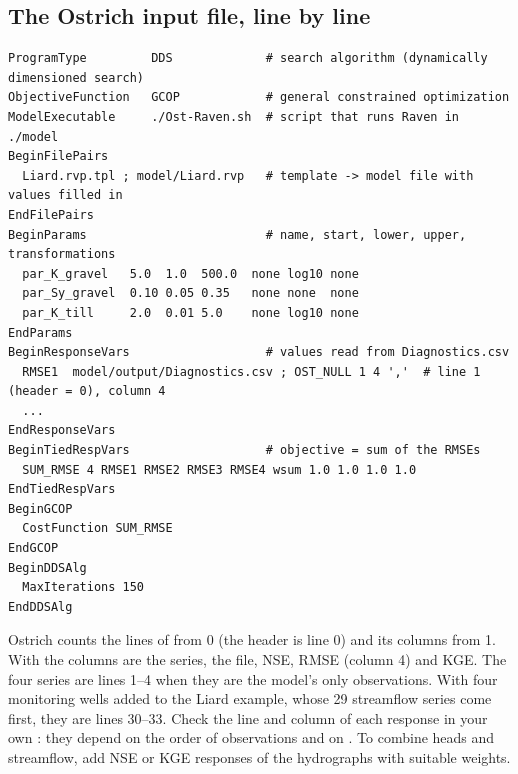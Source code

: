 \subsection{The Ostrich input file, line by line}
\begin{lstlisting}
ProgramType         DDS             # search algorithm (dynamically dimensioned search)
ObjectiveFunction   GCOP            # general constrained optimization
ModelExecutable     ./Ost-Raven.sh  # script that runs Raven in ./model
BeginFilePairs
  Liard.rvp.tpl ; model/Liard.rvp   # template -> model file with values filled in
EndFilePairs
BeginParams                         # name, start, lower, upper, transformations
  par_K_gravel   5.0  1.0  500.0  none log10 none
  par_Sy_gravel  0.10 0.05 0.35   none none  none
  par_K_till     2.0  0.01 5.0    none log10 none
EndParams
BeginResponseVars                   # values read from Diagnostics.csv
  RMSE1  model/output/Diagnostics.csv ; OST_NULL 1 4 ','  # line 1 (header = 0), column 4
  ...
EndResponseVars
BeginTiedRespVars                   # objective = sum of the RMSEs
  SUM_RMSE 4 RMSE1 RMSE2 RMSE3 RMSE4 wsum 1.0 1.0 1.0 1.0
EndTiedRespVars
BeginGCOP
  CostFunction SUM_RMSE
EndGCOP
BeginDDSAlg
  MaxIterations 150
EndDDSAlg
\end{lstlisting}
Ostrich counts the lines of  from 0 (the header is line 0) and its columns from 1. With
 the columns are the series, the file, NSE, RMSE (column 4) and
KGE. The four  series are lines 1--4 when they are the model's only observations. With four monitoring wells
added to the Liard example, whose 29 streamflow series come first, they are lines 30--33. Check the line and column of
each response in your own : they depend on the order of observations and on
. To combine heads and streamflow, add NSE or KGE responses of the hydrographs with suitable
weights.
